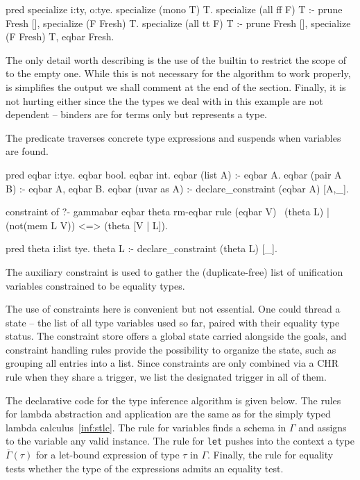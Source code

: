 \documentclass[a4paper, 11pt]{book}
\begin{document}
\begin{elpicode}
pred specialize i:ty, o:tye.
specialize (mono T) T.
specialize (all ff F) T :- prune Fresh [], specialize (F Fresh) T.
specialize (all tt F) T :- prune Fresh [], specialize (F Fresh) T, eqbar Fresh.
\end{elpicode}

\noindent
The only detail worth describing is the use of the  builtin
to restrict the scope of  to the empty one. While this is not
necessary for the algorithm to work properly, is simplifies the output
we shall comment at the end of the section. Finally, it is not hurting either
since the the types we deal with in this example are not dependent -- binders
are for terms only but  represents a type.

The  predicate traverses concrete type expressions and suspends
when variables are found.

\begin{elpicode}
pred eqbar i:tye.
eqbar bool.
eqbar int.
eqbar (list A) :- eqbar A.
eqbar (pair A B) :- eqbar A, eqbar B.
eqbar (uvar as A) :- declare_constraint (eqbar A) [A,_].

constraint of ?- gammabar eqbar theta rm-eqbar {
  rule (eqbar V) \ (theta L) | (not(mem L V)) <=> (theta [V | L]).
}

pred theta i:list tye.
theta L :- declare_constraint (theta L) [_].
\end{elpicode}

\noindent
The auxiliary constraint  is used to gather the (duplicate-free)
list of unification variables constrained to be equality types.

The use of constraints here is convenient but not essential. One could thread
a state -- the list of all type variables used so far, paired with their
equality type status. The constraint store offers a global state carried
alongside the goals, and constraint handling rules provide the possibility to
organize the state, such as grouping all entries into a list. Since
constraints are only combined via a CHR rule when they share a trigger,
we list the designated trigger \elpi{_} in all of them.

The declarative code for the type inference algorithm is given below. The
rules for lambda abstraction and application are the same as for the simply
typed lambda calculus~\cref{inf:stlc}. The rule for variables finds a schema
in $\Gamma$ and assigns to the variable any valid instance. The rule for
\texttt{let} pushes into the context a type $\overline{\Gamma}(\tau)$ for a
let-bound expression of type $\tau$ in $\Gamma$. Finally, the rule for
equality tests whether the type of the expressions admits an equality test.
\end{document}

